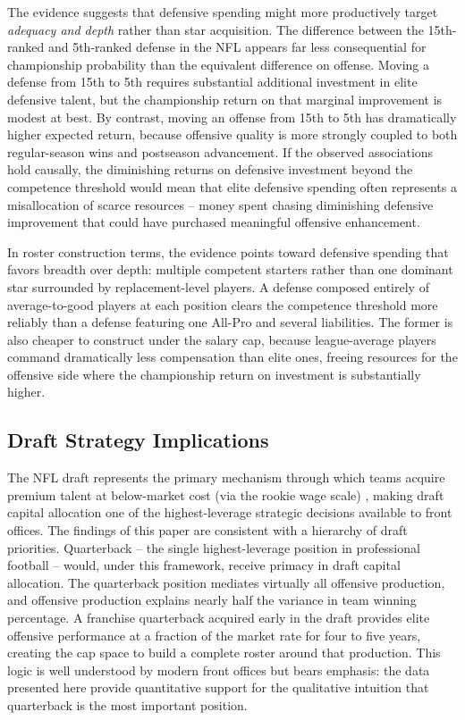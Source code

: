 The evidence suggests that defensive spending might more productively target
\emph{adequacy and depth} rather than star acquisition. The difference between
the 15th-ranked and 5th-ranked defense in the NFL appears far less consequential
for championship probability than the equivalent difference on offense. Moving a defense from
15th to 5th requires substantial additional investment in elite defensive
talent, but the championship return on that marginal improvement is modest at
best. By contrast, moving an offense from 15th to 5th has dramatically higher
expected return, because offensive quality is more strongly coupled to both
regular-season wins and postseason advancement. If the observed associations hold causally, the diminishing returns on
defensive investment beyond the competence threshold would mean that elite
defensive spending often represents a misallocation of scarce resources -- money
spent chasing diminishing defensive improvement that could have purchased
meaningful offensive enhancement.

In roster construction terms, the evidence points toward defensive spending
that favors breadth over depth: multiple competent starters rather than one
dominant star surrounded by replacement-level players. A defense composed
entirely of average-to-good players at each position clears the competence
threshold more reliably than a defense featuring one All-Pro and several
liabilities. The former is also cheaper to construct under the salary cap,
because league-average players command dramatically less compensation than
elite ones, freeing resources for the offensive side where the championship
return on investment is substantially higher.

\subsection{Draft Strategy Implications}
\label{sec:draft-strategy}

The NFL draft represents the primary mechanism through which teams acquire
premium talent at below-market cost (via the rookie wage scale) \parencite{nflcba2020}, making draft
capital allocation one of the highest-leverage strategic decisions available
to front offices. The findings of this paper are consistent with a hierarchy of
draft priorities. Quarterback -- the single highest-leverage position in
professional football -- would, under this framework, receive primacy in draft
capital allocation.
The quarterback position mediates virtually all offensive production, and
offensive production explains nearly half the variance in team winning
percentage. A franchise quarterback acquired early in the draft provides
elite offensive performance at a fraction of the market rate for four to five
years, creating the cap space to build a complete roster around that production.
This logic is well understood by modern front offices but bears emphasis: the
data presented here provide quantitative support for the qualitative intuition
that quarterback is the most important position.

